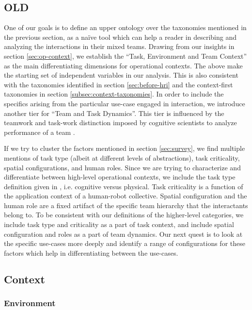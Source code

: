 \documentclass[letterpaper, 10 pt, conference]{ieeeconf}  %
\theoremstyle{definition}
\begin{document}
\subsection{OLD}

One of our goals is to define an upper ontology over the taxonomies mentioned in the previous section, as a na\" ive tool which can help a reader in describing and analyzing the interactions in their mixed teams.
Drawing from our insights in section \ref{sec:op-context}, we establish the ``Task, Environment and Team Context'' as the main differentiating dimensions for operational contexts.
The above make the starting set of independent variables in our analysis.
This is also consistent with the taxonomies identified in section \ref{sec:before-hri} and the context-first taxonomies in section \ref{subsec:context-taxonomies}.
In order to include the specifics arising from the particular use-case engaged in interaction, we introduce another tier for ``Team and Task Dynamics''.
This tier is influenced by the teamwork and task-work distinction imposed by cognitive scientists to analyze performance of a team \cite{Mathieu2000TheIO}.

If we try to cluster the factors mentioned in section \ref{sec:survey}, we find multiple mentions of task type (albeit at different levels of abstractions), task criticality, spatial configurations, and human roles.
Since we are trying to characterize and differentiate between high-level operational contexts, we include the task type definition given in \cite{Phillips2015}, i.e. cognitive versus physical.
Task criticality is a function of the application context of a human-robot collective.
Spatial configuration and the human role are a fixed artifact of the specific team hierarchy that the interactants belong to.
To be consistent with our definitions of the higher-level categories, we include task type and criticality as a part of task context, and include spatial configuration and roles as a part of team dynamics.
Our next quest is to look at the specific use-cases more deeply and identify a range of configurations for these factors which help in differentiating between the use-cases.

\subsection{Context}
\subsubsection{Environment}
\end{document}
